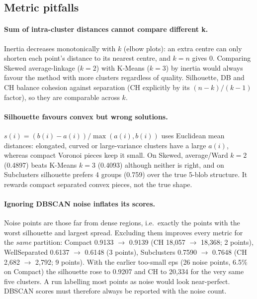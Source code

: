 \documentclass[11pt]{article}
\begin{document}
\subsection{Metric pitfalls}
\paragraph{Sum of intra-cluster distances cannot compare different k.} Inertia decreases
monotonically with $k$ (elbow plots): an extra centre can only shorten each point's distance to its
nearest centre, and $k=n$ gives 0. Comparing Skewed average-linkage ($k=2$) with K-Means ($k=3$) by
inertia would always favour the method with more clusters regardless of quality. Silhouette, DB and
CH balance cohesion against separation (CH explicitly by its $(n-k)/(k-1)$ factor), so they are
comparable across $k$.

\paragraph{Silhouette favours convex but wrong solutions.} $s(i)=(b(i)-a(i))/\max(a(i),b(i))$ uses
Euclidean mean distances: elongated, curved or large-variance clusters have a large $a(i)$, whereas
compact Voronoi pieces keep it small. On Skewed, average/Ward $k=2$ (0.4897) beats K-Means $k=3$
(0.4093) although neither is right, and on Subclusters silhouette prefers 4 groups (0.759) over the
true 5-blob structure. It rewards compact separated convex pieces, not the true shape.

\paragraph{Ignoring DBSCAN noise inflates its scores.} Noise points are those far from dense regions,
i.e.\ exactly the points with the worst silhouette and largest spread. Excluding them improves every
metric for the \emph{same} partition: Compact 0.9133 $\to$ 0.9139 (CH 18{,}057 $\to$ 18{,}368; 2 points),
WellSeparated 0.6137 $\to$ 0.6148 (3 points), Subclusters 0.7590 $\to$ 0.7648 (CH 2{,}682 $\to$
2{,}792; 9 points). With the earlier too-small eps (26 noise points, 6.5\% on Compact) the silhouette
rose to 0.9207 and CH to 20{,}334 for the very same five clusters. A run labelling most points as
noise would look near-perfect. DBSCAN scores must therefore always be reported with the noise count.

\end{document}
